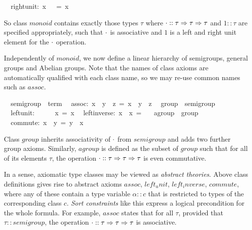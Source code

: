 \begin{isabelle}
\ \ right{\isacharunderscore}unit:\ {\isachardoublequote}x\ {\isasymOtimes}\ {\isasymunit}\ =\ x{\isachardoublequote}%
\begin{isamarkuptext}%
\noindent So class $monoid$ contains exactly those types $\tau$ where
 $\cdot :: \tau \Rightarrow \tau \Rightarrow \tau$ and $1 :: \tau$ are specified
 appropriately, such that $\cdot$ is associative and $1$ is a left
 and right unit element for the $\cdot$ operation.%
\end{isamarkuptext}%
%
\begin{isamarkuptext}%
\medskip Independently of $monoid$, we now define a linear hierarchy
 of semigroups, general groups and Abelian groups.  Note that the
 names of class axioms are automatically qualified with each class
 name, so we may re-use common names such as $assoc$.%
\end{isamarkuptext}%
\isanewline
\ \ semigroup\ {\isacharless}\ {\isachardoublequote}term{\isachardoublequote}\isanewline
\ \ assoc:\ {\isachardoublequote}{\isacharparenleft}x\ {\isasymOtimes}\ y{\isacharparenright}\ {\isasymOtimes}\ z\ =\ x\ {\isasymOtimes}\ {\isacharparenleft}y\ {\isasymOtimes}\ z{\isacharparenright}{\isachardoublequote}\isanewline
\isanewline
{}\isanewline
\ \ group\ {\isacharless}\ semigroup\isanewline
\ \ left{\isacharunderscore}unit:\ \ \ \ {\isachardoublequote}{\isasymunit}\ {\isasymOtimes}\ x\ =\ x{\isachardoublequote}\isanewline
\ \ left{\isacharunderscore}inverse:\ {\isachardoublequote}x{\isasyminv}\ {\isasymOtimes}\ x\ =\ {\isasymunit}{\isachardoublequote}\isanewline
\isanewline
{}\isanewline
\ \ agroup\ {\isacharless}\ group\isanewline
\ \ commute:\ {\isachardoublequote}x\ {\isasymOtimes}\ y\ =\ y\ {\isasymOtimes}\ x{\isachardoublequote}%
\begin{isamarkuptext}%
\noindent Class $group$ inherits associativity of $\cdot$ from
 $semigroup$ and adds two further group axioms. Similarly, $agroup$
 is defined as the subset of $group$ such that for all of its elements
 $\tau$, the operation $\cdot :: \tau \Rightarrow \tau \Rightarrow \tau$ is even
 commutative.%
\end{isamarkuptext}%
%
%
\begin{isamarkuptext}%
In a sense, axiomatic type classes may be viewed as \emph{abstract
 theories}.  Above class definitions gives rise to abstract axioms
 $assoc$, $left_unit$, $left_inverse$, $commute$, where any of these
 contain a type variable $\alpha :: c$ that is restricted to types of
 the corresponding class $c$.  \emph{Sort constraints} like this
 express a logical precondition for the whole formula.  For example,
 $assoc$ states that for all $\tau$, provided that $\tau ::
 semigroup$, the operation $\cdot :: \tau \Rightarrow \tau \Rightarrow \tau$ is
 associative.


\end{isamarkuptext}
\end{isabelle}
